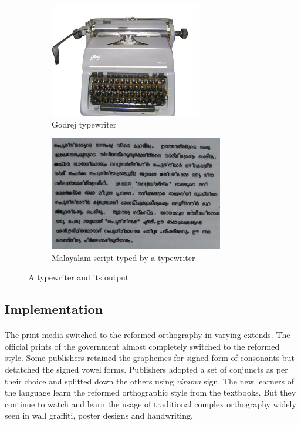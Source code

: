 \documentclass[10pt]{article}
\begin{document}
\begin{figure}[h!]
\begin{subfigure}{.5\textwidth}
 \centering
 \includegraphics[width=\linewidth, height=5cm]{images/godrej-typewriter.jpg}
   \caption{Godrej typewriter}
\label{godrej}
\end{subfigure}%
\begin{subfigure}{.5\textwidth}
 \centering
 \includegraphics[width=\linewidth,height=5cm]{images/typewritertext4.jpg}
 \caption{Malayalam script typed by a typewriter}
 \label{typewritertext}
\end{subfigure}
\caption{A typewriter and its output}
\label{typewriter}
\end{figure}

\subsection{Implementation}

\paragraph{}
The print media switched to the reformed orthography in varying extends. The official prints of the government almost completely switched to the reformed style. Some publishers retained the graphemes for signed form of consonants but detatched the signed vowel forms. Publishers adopted a set of conjuncts as per their choice and splitted down the others using \textit{virama} sign. The new learners of the language learn the reformed orthographic style from the textbooks. But they continue to watch and learn the usage of traditional complex orthography widely seen in wall graffiti, poster designs and handwriting.
\end{document}
